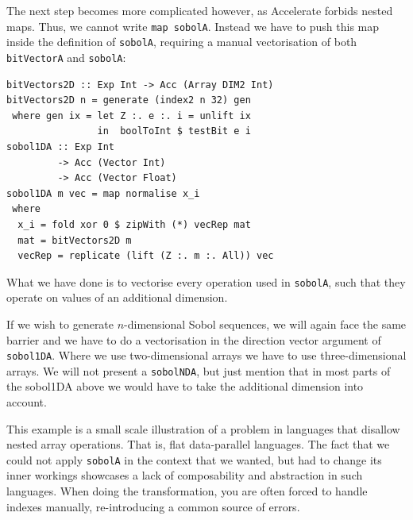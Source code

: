 \documentclass[preprint]{sigplanconf}
\begin{document}
The next step becomes more complicated however, as Accelerate forbids
nested maps. Thus, we cannot write \verb|map sobolA|.  Instead we have
to push this map inside the definition of \verb|sobolA|, requiring a
manual vectorisation of both \verb|bitVectorA| and \verb|sobolA|:
\begin{verbatim}
bitVectors2D :: Exp Int -> Acc (Array DIM2 Int)
bitVectors2D n = generate (index2 n 32) gen
 where gen ix = let Z :. e :. i = unlift ix
                in  boolToInt $ testBit e i
sobol1DA :: Exp Int
         -> Acc (Vector Int)
         -> Acc (Vector Float)
sobol1DA m vec = map normalise x_i
 where
  x_i = fold xor 0 $ zipWith (*) vecRep mat
  mat = bitVectors2D m
  vecRep = replicate (lift (Z :. m :. All)) vec
\end{verbatim}
What we have done is to vectorise every operation used in
\verb|sobolA|, such that they operate on values of an additional
dimension.

If we wish to generate $n$-dimensional Sobol sequences, we will again
face the same barrier and we have to do a vectorisation in the
direction vector argument of \verb|sobol1DA|. Where we use
two-dimensional arrays we have to use three-dimensional arrays. We
will not present a \verb|sobolNDA|, but just mention that in most
parts of the sobol1DA above we would have to take the additional
dimension into account.


This example is a small scale illustration of a problem in languages
that disallow nested array operations. That is, flat data-parallel
languages. The fact that we could not apply \verb|sobolA| in the
context that we wanted, but had to change its inner workings showcases
a lack of composability and abstraction in such languages. When doing
the transformation, you are often forced to handle indexes manually,
re-introducing a common source of errors.
\end{document}
